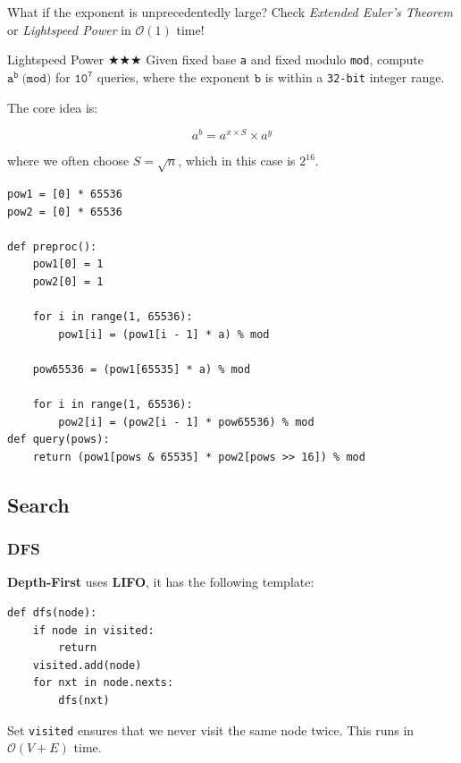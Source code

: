 \documentclass{article}
\begin{document}
What if the exponent is unprecedentedly large? Check \emph{Extended Euler's Theorem} or \emph{Lightspeed Power} in $\mathcal O(1)$ time!

\begin{Question}{Lightspeed Power $\bigstar\bigstar\bigstar$}
Given fixed base \texttt{a} and fixed modulo \texttt{mod}, compute $\texttt{a}^{\texttt{b}}\ \texttt{(mod)}$ for $\texttt{10}^{\texttt{7}}$ queries, where the exponent $\texttt{b}$ is within a \texttt{32-bit} integer range.

\end{Question}

The core idea is:

$$
a^b=a^{x\times S}\times a^y
$$

where we often choose $S=\sqrt{n}$, which in this case is $2^{16}$.

\begin{lstlisting}[style=python]
pow1 = [0] * 65536
pow2 = [0] * 65536

def preproc():
    pow1[0] = 1
    pow2[0] = 1
    
    for i in range(1, 65536):
        pow1[i] = (pow1[i - 1] * a) % mod
        
    pow65536 = (pow1[65535] * a) % mod
    
    for i in range(1, 65536):
        pow2[i] = (pow2[i - 1] * pow65536) % mod
def query(pows):
    return (pow1[pows & 65535] * pow2[pows >> 16]) % mod
\end{lstlisting}


\subsection{Search}

\subsubsection{DFS}

\textbf{Depth-First} uses \textbf{LIFO}, it has the following template:

\begin{lstlisting}[style=python]
def dfs(node):
    if node in visited:
        return
    visited.add(node)
    for nxt in node.nexts:
        dfs(nxt)
\end{lstlisting}

Set \texttt{visited} ensures that we never visit the same node twice. This runs in $\mathcal{O}(V+E)$ time.
\end{document}

